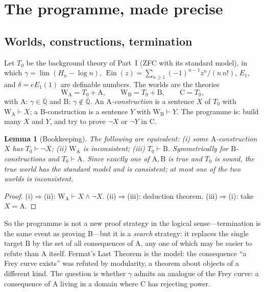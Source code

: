 \documentclass[11pt,a4paper]{article}
\newcommand{\Qbar}{\overline{\mathbb Q}}
\newcommand{\Ein}{\operatorname{Ein}}
\newcommand{\Tz}{T_0}
\newtheorem{lemma}[theorem]{Lemma}
\theoremstyle{definition}
\theoremstyle{remark}
\numberwithin{equation}{section}
\begin{document}
\section{The programme, made precise}\label{III:sec:programme}

\subsection{Worlds, constructions, termination}

Let $\Tz$ be the background theory of Part~I (ZFC with its standard model), in which
$\gamma=\lim(H_n-\log n)$, $\Ein(z)=\sum_{n\ge1}(-1)^{n-1}z^n/(n\,n!)$, $E_1$, and
$\delta=eE_1(1)$ are definable numbers. The worlds are the theories
\[
 \mathrm W_{\mathrm A}=\Tz+\mathrm A,\qquad \mathrm W_{\mathrm B}=\Tz+\mathrm B,\qquad
 \mathrm C=\Tz,
\]
with $\mathrm A$: $\gamma\in\Qbar$ and $\mathrm B$: $\gamma\notin\Qbar$. An
\emph{$\mathrm A$-construction} is a sentence $X$ of $\Tz$ with
$\mathrm W_{\mathrm A}\vdash X$; a $\mathrm B$-construction is a sentence $Y$ with
$\mathrm W_{\mathrm B}\vdash Y$. The programme is: build many $X$ and $Y$, and try to
prove $\neg X$ or $\neg Y$ in $\mathrm C$.

\begin{lemma}[Bookkeeping]\label{III:lem:bookkeeping}
The following are equivalent: (i) some $\mathrm A$-construction $X$ has $\Tz\vdash\neg X$;
(ii) $\mathrm W_{\mathrm A}$ is inconsistent; (iii) $\Tz\vdash\mathrm B$. Symmetrically
for $\mathrm B$-constructions and $\Tz\vdash\mathrm A$. Since exactly one of
$\mathrm A,\mathrm B$ is true and $\Tz$ is sound, the true world has the standard model
and is consistent; at most one of the two worlds is inconsistent.
\end{lemma}
\begin{proof}
(i)$\Rightarrow$(ii): $\mathrm W_{\mathrm A}\vdash X\wedge\neg X$.
(ii)$\Rightarrow$(iii): deduction theorem. (iii)$\Rightarrow$(i): take $X=\mathrm A$.
\end{proof}

So the programme is not a new proof strategy in the logical sense---termination is the
same event as proving $\mathrm B$---but it is a \emph{search} strategy: it replaces the
single target $\mathrm B$ by the set of all consequences of $\mathrm A$, any one of which
may be easier to refute than $\mathrm A$ itself. Fermat's Last Theorem is the model:
the consequence ``a Frey curve exists'' was refuted by modularity, a theorem about
objects of a different kind. The question is whether $\gamma$ admits an analogue of the
Frey curve: a consequence of $\mathrm A$ living in a domain where $\mathrm C$ has
rejecting power.
\end{document}
